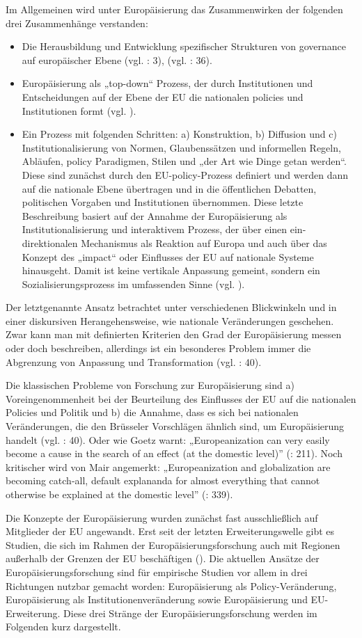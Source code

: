Im Allgemeinen wird unter Europäisierung das Zusammenwirken der folgenden drei Zusammenhänge verstanden: 
\begin{itemize}
\item Die Herausbildung und Entwicklung spezifischer Strukturen von governance auf europäischer Ebene (vgl. \cite{risseetal}: 3), (vgl. \cite{radpas}: 36).
\item Europäisierung als „top-down“ Prozess, der durch Institutionen und Entscheidungen auf der Ebene der EU die nationalen policies und Institutionen formt (vgl. \cite{herit}).
\item Ein Prozess mit folgenden Schritten: a) Konstruktion, b) Diffusion und c) Institutionalisierung von Normen, Glaubenssätzen und informellen Regeln, Abläufen, policy Paradigmen, Stilen und „der Art wie Dinge getan werden“. Diese sind zunächst durch den EU-policy-Prozess definiert und werden dann auf die nationale Ebene übertragen und in die öffentlichen Debatten, politischen Vorgaben und Institutionen übernommen. Diese letzte Beschreibung basiert auf der Annahme der Europäisierung als Institutionalisierung und interaktivem Prozess, der über einen ein-direktionalen Mechanismus als Reaktion auf Europa und auch über das Konzept des „impact“ oder Einflusses der EU auf nationale Systeme hinausgeht. Damit ist keine vertikale Anpassung gemeint, sondern ein Sozialisierungsprozess im umfassenden Sinne (vgl. \cite{fearad03,Featherstone/Radaelli 2003, olsen}).
\end{itemize}
Der letztgenannte Ansatz betrachtet unter verschiedenen Blickwinkeln und in einer diskursiven Herangehensweise, wie nationale Veränderungen geschehen. Zwar kann man mit definierten Kriterien den Grad der Europäisierung messen oder doch beschreiben, allerdings ist ein besonderes Problem immer die Abgrenzung von Anpassung und Transformation (vgl. \cite{radpas}: 40).\par
Die klassischen Probleme von Forschung zur Europäisierung sind a) Voreingenommenheit bei der Beurteilung des Einflusses der EU auf die nationalen Policies und Politik und b) die Annahme, dass es sich bei nationalen Veränderungen, die den Brüsseler Vorschlägen ähnlich sind, um Europäisierung handelt (vgl. \cite{radpas}: 40). Oder wie Goetz warnt: „Europeanization can very easily become a cause in the search of an effect (at the domestic level)” (\cite{goetz01a}: 211). Noch kritischer wird von Mair angemerkt: „Europeanization and globalization are becoming catch-all, default explananda for almost everything that cannot otherwise be explained at the domestic level” (\cite{mair}: 339).\par
Die Konzepte der Europäisierung wurden zunächst fast ausschließlich auf Mitglieder der EU angewandt. Erst seit der letzten Erweiterungswelle gibt es Studien, die sich im Rahmen der Europäisierungsforschung auch mit Regionen außerhalb der Grenzen der EU beschäftigen (\cite{lipumwes, grab03, papadi, lavenex, schsed05b,schsed05c}). Die aktuellen Ansätze der Europäisierungsforschung sind für empirische Studien vor allem in drei Richtungen nutzbar gemacht worden: Europäisierung als Policy-Veränderung, Europäisierung als Institutionenveränderung sowie Europäisierung und EU-Erweiterung. Diese drei Stränge der Europäisierungsforschung werden im Folgenden kurz dargestellt.
